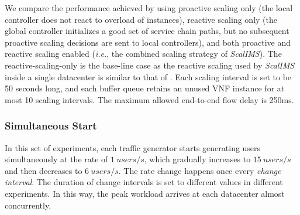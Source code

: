 We compare the performance achieved by using proactive scaling only (the local controller does not react to overload of instances), reactive scaling only (the global controller initializes a good set of service chain paths, but no subsequent proactive scaling decisions are sent to local controllers), and both proactive and reactive scaling enabled ({\em i.e.}, the combined scaling strategy of \textit{ScalIMS}). The reactive-scaling-only is the base-line case as the reactive scaling used by \textit{ScalIMS} inside a single datacenter is similar to that of \cite{gember2012stratos, palkar2015e2}. Each scaling interval is set to be 50 seconds long, and each buffer queue retains an unused VNF instance for at most 10 scaling intervals. The maximum allowed end-to-end flow delay is 250ms.

\subsubsection{Simultaneous Start}

In this set of experiments, each traffic generator starts generating users simultaneously at the rate of $1~users/s$, which gradually increases to $15~users/s$ and then decreases to $6~users/s$. The rate change happens once every \textit{change interval}. The duration of change intervals is set to different values in different experiments.
In this way, the peak workload arrives at each datacenter almost concurrently. %

